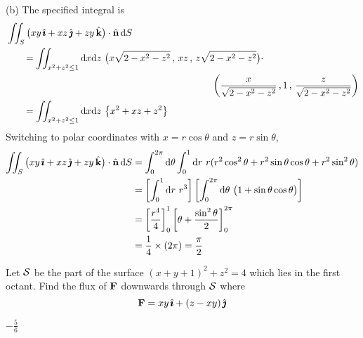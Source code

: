 \begin{solution}
(b)
The specified integral is
\begin{align*}
&\dblInt_S \big(xy\,\hi + xz\,\hj + zy\,\hk\big)\cdot\hn\,\dee{S} \\
&\hskip0.25in=
   \dblInt_{x^2+z^2\le 1}\dee{x}\dee{z}\ 
   \big(x\sqrt{2-x^2-z^2}\,,\,
      xz\,,\,
      z\sqrt{2-x^2-z^2}\big)\cdot \\&\hskip3in
\left(\frac{x}{\sqrt{2-x^2-z^2}}\,,1\,,\, \frac{z}{\sqrt{2-x^2-z^2}}\right) \\
&\hskip0.25in=
   \dblInt_{x^2+z^2\le 1}\dee{x}\dee{z}\ 
   \big\{x^2 +xz +z^2
   \big\} \\
\end{align*}
Switching to polar coordinates with $x=r\cos\theta$ and $z=r\sin\theta$,
\begin{align*}
\dblInt_S \big(xy\,\hi + xz\,\hj + zy\,\hk\big)\cdot\hn\,\dee{S}
&=\int_0^{2\pi}\dee{\theta}\int_0^1\dee{r}\ 
    r(r^2\cos^2\theta +r^2\sin\theta\cos\theta +r^2\sin^2\theta) \\ 
&= 
   \left[\int_0^1\dee{r}\ r^3\right]
   \left[\int_0^{2\pi}\dee{\theta}\ \big(1+\sin\theta\cos\theta\big)\right] \\
&= \left[\frac{r^4}{4}\right]_0^1
                 \left[\theta+\frac{\sin^2\theta}{2}\right]_0^{2\pi} \\
&= \frac{1}{4}\times (2\pi) 
=\frac{\pi}{2}
\end{align*}

\end{solution}

\begin{question}[M317 1998D] %
 Let $\mathcal{S}$ be the part of the surface $(x+y+1)^2+z^2=4$
which lies in the first octant. Find the flux of $\mathbf{F}$ downwards through
$\mathcal{S}$ where  
$$
\mathbf{F}=xy\,\hat{\pmb{\imath}}+(z-xy)\,\hat{\pmb{\jmath}}
$$
\end{question}


\begin{answer} 
$-\frac{5}{6}$
\end{answer}

